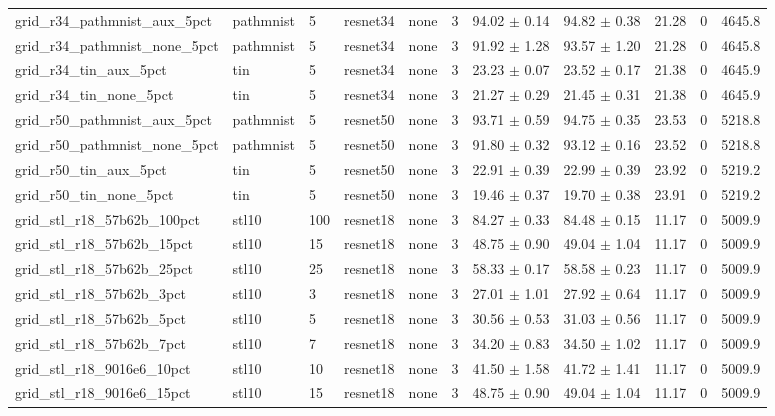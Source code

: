 \begin{tabular}{lllllllllll}
grid_r34_pathmnist_aux_5pct & pathmnist & 5 & resnet34 & none & 3 & 94.02 $\pm$ 0.14 & 94.82 $\pm$ 0.38 & 21.28 & 0 & 4645.8 \\
grid_r34_pathmnist_none_5pct & pathmnist & 5 & resnet34 & none & 3 & 91.92 $\pm$ 1.28 & 93.57 $\pm$ 1.20 & 21.28 & 0 & 4645.8 \\
grid_r34_tin_aux_5pct & tin & 5 & resnet34 & none & 3 & 23.23 $\pm$ 0.07 & 23.52 $\pm$ 0.17 & 21.38 & 0 & 4645.9 \\
grid_r34_tin_none_5pct & tin & 5 & resnet34 & none & 3 & 21.27 $\pm$ 0.29 & 21.45 $\pm$ 0.31 & 21.38 & 0 & 4645.9 \\
grid_r50_pathmnist_aux_5pct & pathmnist & 5 & resnet50 & none & 3 & 93.71 $\pm$ 0.59 & 94.75 $\pm$ 0.35 & 23.53 & 0 & 5218.8 \\
grid_r50_pathmnist_none_5pct & pathmnist & 5 & resnet50 & none & 3 & 91.80 $\pm$ 0.32 & 93.12 $\pm$ 0.16 & 23.52 & 0 & 5218.8 \\
grid_r50_tin_aux_5pct & tin & 5 & resnet50 & none & 3 & 22.91 $\pm$ 0.39 & 22.99 $\pm$ 0.39 & 23.92 & 0 & 5219.2 \\
grid_r50_tin_none_5pct & tin & 5 & resnet50 & none & 3 & 19.46 $\pm$ 0.37 & 19.70 $\pm$ 0.38 & 23.91 & 0 & 5219.2 \\
grid_stl_r18_57b62b_100pct & stl10 & 100 & resnet18 & none & 3 & 84.27 $\pm$ 0.33 & 84.48 $\pm$ 0.15 & 11.17 & 0 & 5009.9 \\
grid_stl_r18_57b62b_15pct & stl10 & 15 & resnet18 & none & 3 & 48.75 $\pm$ 0.90 & 49.04 $\pm$ 1.04 & 11.17 & 0 & 5009.9 \\
grid_stl_r18_57b62b_25pct & stl10 & 25 & resnet18 & none & 3 & 58.33 $\pm$ 0.17 & 58.58 $\pm$ 0.23 & 11.17 & 0 & 5009.9 \\
grid_stl_r18_57b62b_3pct & stl10 & 3 & resnet18 & none & 3 & 27.01 $\pm$ 1.01 & 27.92 $\pm$ 0.64 & 11.17 & 0 & 5009.9 \\
grid_stl_r18_57b62b_5pct & stl10 & 5 & resnet18 & none & 3 & 30.56 $\pm$ 0.53 & 31.03 $\pm$ 0.56 & 11.17 & 0 & 5009.9 \\
grid_stl_r18_57b62b_7pct & stl10 & 7 & resnet18 & none & 3 & 34.20 $\pm$ 0.83 & 34.50 $\pm$ 1.02 & 11.17 & 0 & 5009.9 \\
grid_stl_r18_9016e6_10pct & stl10 & 10 & resnet18 & none & 3 & 41.50 $\pm$ 1.58 & 41.72 $\pm$ 1.41 & 11.17 & 0 & 5009.9 \\
grid_stl_r18_9016e6_15pct & stl10 & 15 & resnet18 & none & 3 & 48.75 $\pm$ 0.90 & 49.04 $\pm$ 1.04 & 11.17 & 0 & 5009.9 \\

\end{tabular}
